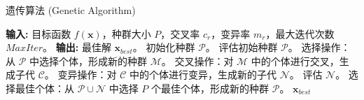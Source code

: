 \documentclass{article}
\begin{document}
	
	\begin{algorithm}
		\caption{遗传算法 (Genetic Algorithm)}
		\begin{algorithmic}[1]
			\State \textbf{输入:} 目标函数 $f(\mathbf{x})$，种群大小 $P$，交叉率 $c_r$，变异率 $m_r$，最大迭代次数 $MaxIter$。
			\State \textbf{输出:} 最佳解 $\mathbf{x}_{best}$。
			\State 初始化种群 $\mathcal{P}$。
			\State 评估初始种群 $\mathcal{P}$。
			\State 选择操作：从 $\mathcal{P}$ 中选择个体，形成新的种群 $\mathcal{M}$。
			\State 交叉操作：对 $\mathcal{M}$ 中的个体进行交叉，生成子代 $\mathcal{C}$。
			\State 变异操作：对 $\mathcal{C}$ 中的个体进行变异，生成新的子代 $\mathcal{N}$。
			\State 评估 $\mathcal{N}$。
			\State 选择最佳个体：从 $\mathcal{P} \cup \mathcal{N}$ 中选择 $P$ 个最佳个体，形成新的种群 $\mathcal{P}$。
			\EndFor
			\State \Return $\mathbf{x}_{best}$
		\end{algorithmic}
	\end{algorithm}
	
\end{document}
